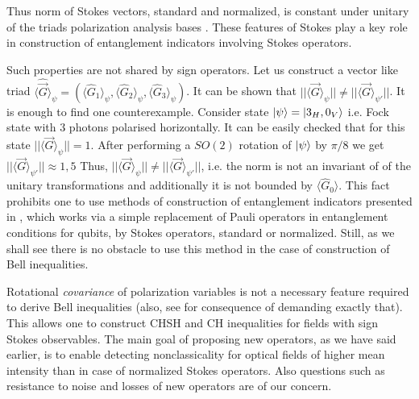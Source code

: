 \documentclass[aps,pra, twocolumn, showpacs]{revtex4-2}
\begin{document}
Thus norm of Stokes vectors, standard and normalized, is  constant under unitary   of the triads polarization analysis bases . 
These features of Stokes  play a key role  in construction of  entanglement indicators involving Stokes operators. 

Such properties are not shared by sign operators. Let us construct a vector like triad
$\langle \hat{ \overrightarrow{G}}\rangle_\psi =
(\langle \hat G_1\rangle_\psi,\langle \hat G_2\rangle_\psi,\langle \hat G_3\rangle_\psi)$. It can be shown that $||\langle \overrightarrow{G}\rangle_\psi|| \neq ||\langle \overrightarrow{G}\rangle_{\psi'}||$. 
It is enough to find one counterexample. Consider state $\ket{\psi}   = \ket{3_H,0_V}$ i.e. Fock state with $3$ photons polarised horizontally. It can be easily checked that for this state $||\langle \overrightarrow{G}\rangle_{\psi}||=1$.
After performing a $\mathit{SO}(2)$ rotation of
$\ket{\psi}$  by  $\pi/8$ we get
 $||\langle \overrightarrow{G}\rangle_{\psi'}|| \approx 1,5$ Thus, 
$||\langle \overrightarrow{G}\rangle_{\psi} || \neq  ||\langle\overrightarrow{G}\rangle_{\psi'}||
$, i.e. the norm is not an invariant of of the unitary transformations 
and additionally it is not bounded by $\langle \hat G_0\rangle$. This fact prohibits one to use methods of construction of entanglement indicators presented in \cite{ZUKUPRA}, which works via a simple replacement of Pauli operators in entanglement conditions for qubits, by Stokes operators, standard or normalized. Still, as we shall see there is no obstacle to use this method in the case of construction of Bell inequalities.



Rotational {\em covariance} of polarization variables is not a necessary feature required to derive Bell inequalities (also, see \cite{RotInv} for consequence of demanding exactly that). This allows one to construct CHSH and CH inequalities for fields with sign Stokes observables.
The main goal of proposing new operators, as we have said earlier, is to enable detecting nonclassicality for optical fields of higher mean intensity than in case of normalized Stokes operators. Also questions such as resistance to noise and losses of new operators are  of our concern. 



\end{document}
